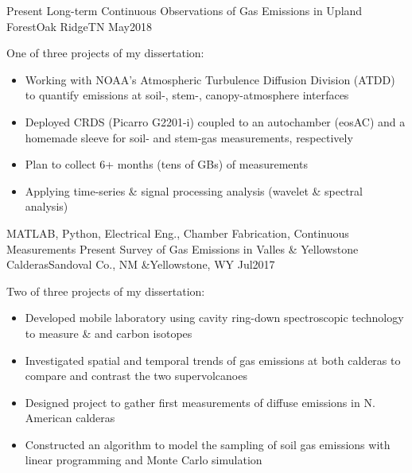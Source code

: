 %
%
%
\begin{experiences}
  \experience
    {Present}       {Long-term Continuous Observations of Gas Emissions in Upland Forest}{Oak Ridge}{TN}
    {May2018}      {
                    One of three projects of my dissertation:
                      \begin{itemize}
                        \item Working with NOAA’s Atmospheric Turbulence Diffusion Division (ATDD) to quantify  emissions at soil-, stem-, canopy-atmosphere interfaces                        
                        \item Deployed CRDS (Picarro G2201-i) coupled to an autochamber (eosAC) and a homemade sleeve for soil- and stem-gas measurements, respectively
                        \item Plan to collect 6+ months (tens of GBs) of measurements               
                        \item Applying time-series \& signal processing analysis (wavelet \& spectral analysis)     
                      \end{itemize}
                    }
                    {MATLAB, Python, Electrical Eng., Chamber Fabrication, Continuous Measurements}
  \emptySeparator
  \experience
    {Present}       {Survey of Gas Emissions in Valles \& Yellowstone Calderas}{Sandoval Co., NM \&}{Yellowstone, WY}
    {Jul2017}      {
                    Two of three projects of my dissertation:
                      \begin{itemize}
                        \item Developed mobile laboratory using cavity ring-down spectroscopic technology to measure  \&  and carbon isotopes
                        \item Investigated spatial and temporal trends of gas emissions at both calderas to compare and contrast the two supervolcanoes      
                        \item Designed project to gather first measurements of diffuse  emissions in N. American calderas 
                        \item Constructed an algorithm to model the sampling of soil gas emissions with linear programming and Monte Carlo simulation

\end{itemize}}
\end{experiences}
